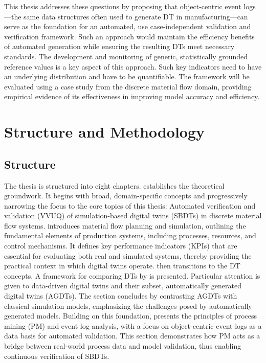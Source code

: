 This thesis addresses these questions by proposing that object-centric event logs—the same data structures often used to generate DT in manufacturing—can serve as the foundation for an automated, use case-independent validation and verification framework. Such an approach would maintain the efficiency benefits of automated generation while ensuring the resulting DTs meet necessary standards. The development and monitoring of generic, statistically grounded reference values is a key aspect of this approach. Such key indicators need to have an underlying distribution and have to be quantifiable. The framework will be evaluated using a case study from the discrete material flow domain, providing empirical evidence of its effectiveness in improving model accuracy and efficiency.

\section{Structure and Methodology}

\subsection*{Structure}
The thesis is structured into eight chapters.
 establishes the theoretical groundwork. It begins with broad, domain-specific concepts and progressively narrowing the focus to the core topics of this thesis: Automated verification and validation (VVUQ) of simulation-based digital twins (SBDTs) in discrete material flow systems.
 introduces material flow planning and simulation, outlining the fundamental elements of production systems, including processes, resources, and control mechanisms. It defines key performance indicators (KPIs) that are essential for evaluating both real and simulated systems, thereby providing the practical context in which digital twins operate.
 then transitions to the DT concepts. A framework for comparing DTs by \textcite{schwede2024learning} is presented. Particular attention is given to data-driven digital twins and their subset, automatically generated digital twins (AGDTs). The section concludes by contrasting AGDTs with classical simulation models, emphasizing the challenges posed by automatically generated models.
Building on this foundation,  presents the principles of process mining (PM) and event log analysis, with a focus on object-centric event logs as a data basis for automated validation. This section demonstrates how PM acts as a bridge between real-world process data and model validation, thus enabling continuous verification of SBDTs.

